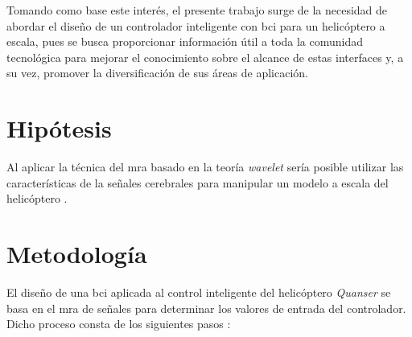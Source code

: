     Tomando como base este interés, el presente trabajo surge de la necesidad de abordar el diseño de un controlador inteligente con \acrlong{bci} para un helicóptero a escala, pues se busca proporcionar información útil a toda la comunidad tecnológica para mejorar el conocimiento sobre el alcance de estas interfaces y, a su vez, promover la diversificación de sus áreas de aplicación.

\section{Hipótesis}

    Al aplicar la técnica del \acrlong{mra} basado en la teoría \textit{wavelet} sería posible utilizar las características de la señales cerebrales para manipular un modelo a escala del helicóptero \Quanser.

\section{Metodología}

    El diseño de una \acrlong{bci} aplicada al control inteligente del helicóptero \textit{Quanser} se basa en el \acrlong{mra} de señales para determinar los valores de entrada del controlador. Dicho proceso consta de los siguientes pasos \cite{AlonsoValerdi2019,GarciaBlancas2016}:
    

